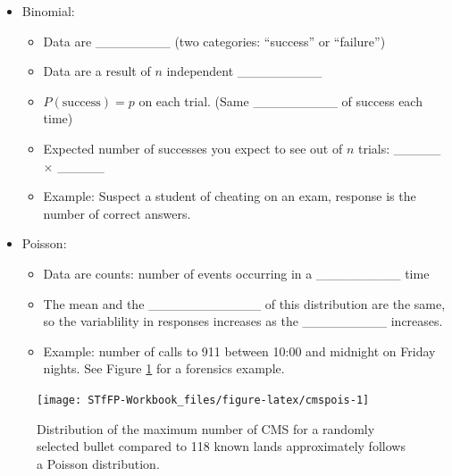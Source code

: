 \documentclass[]{book}
\providecommand{\tightlist}{%
  \setlength{\itemsep}{0pt}\setlength{\parskip}{0pt}}
\theoremstyle{definition}
\theoremstyle{definition}
\theoremstyle{remark}
\begin{document}
\begin{itemize}
\tightlist
\item
  Binomial: \vspace{.1in}

  \begin{itemize}
  \tightlist
  \item
    Data are \_\_\_\_\_\_\_\_ (two categories: ``success'' or
    ``failure'') \vspace{.1in}
  \item
    Data are a result of \(n\) independent \_\_\_\_\_\_\_\_\_
    \vspace{.1in}
  \item
    \(P(\text{success}) = p\) on each trial. (Same \_\_\_\_\_\_\_\_\_ of
    success each time) \vspace{.1in}
  \item
    Expected number of successes you expect to see out of \(n\) trials:
    \_\_\_\_\_ \(\times\) \_\_\_\_\_ \vspace{.1in}
  \item
    Example: Suspect a student of cheating on an exam, response is the
    number of correct answers.
  \end{itemize}
\item
  Poisson: \vspace{.1in}

  \begin{itemize}
  \tightlist
  \item
    Data are counts: number of events occurring in a \_\_\_\_\_\_\_\_\_
    time \vspace{.1in}
  \item
    The mean and the \_\_\_\_\_\_\_\_\_\_\_\_ of this distribution are
    the same, so the variablility in responses increases as the
    \_\_\_\_\_\_\_\_\_ increases. \vspace{.1in}
  \item
    Example: number of calls to 911 between 10:00 and midnight on Friday
    nights. See Figure \ref{fig:cmspois} for a forensics example.
  \end{itemize}
\end{itemize}

\begin{figure}[h]

{\centering \texttt{[image: STfFP-Workbook\_files/figure-latex/cmspois-1]} 

}

\caption{Distribution of the maximum number of CMS for a randomly selected bullet compared to 118 known lands approximately follows a Poisson distribution.}\label{fig:cmspois}
\end{figure}
\end{document}
